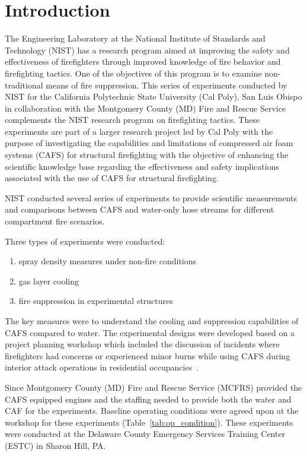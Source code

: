 \documentclass[12pt,oneside]{book}
\begin{document}
\chapter{Introduction}
\label{chap:Introduction}
\setcounter{page}{1}

The Engineering Laboratory at the National Institute of Standards and Technology (NIST) has a research program aimed at improving the safety and effectiveness of firefighters through improved knowledge of fire behavior and firefighting tactics. One of the objectives of this program is to examine non-traditional means of fire suppression. This series of experiments conducted by NIST for the California Polytechnic State University (Cal Poly), San Luis Obispo in collaboration with the Montgomery County (MD) Fire and Rescue Service complements the NIST research program on firefighting tactics. These experiments are part of a larger research project led by Cal Poly with the purpose of investigating the capabilities and limitations of compressed air foam systems (CAFS) for structural firefighting with the objective of enhancing the scientific knowledge base regarding the effectiveness and safety implications associated with the use of CAFS for structural firefighting.
  
NIST conducted several series of experiments to provide scientific measurements and comparisons between CAFS and water-only hose streams for different compartment fire scenarios.  

Three types of experiments were conducted: 
\begin{enumerate}
\item spray density measures under non-fire conditions 
\item gas layer cooling 
\item fire suppression in experimental structures
\end{enumerate}

The key measures were to understand the cooling and suppression capabilities of CAFS compared to water. The experimental designs were developed based on a project planning workshop which included the discussion of incidents where firefighters had concerns or experienced minor burns while using CAFS during interior attack operations in residential occupancies~\cite{Grant:2011}.

Since Montgomery County (MD) Fire and Rescue Service (MCFRS) provided the CAFS equipped engines and the staffing needed to provide both the water and CAF for the experiments. Baseline operating conditions were agreed upon at the workshop for these experiments (Table~\ref{tab:op_condition}). These experiments were conducted at the Delaware County Emergency Services Training Center (ESTC) in Sharon Hill, PA.   
\end{document}
